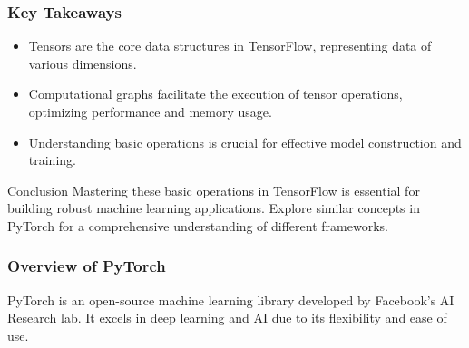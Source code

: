 \documentclass[aspectratio=169]{beamer}
\begin{document}
\begin{frame}
    \frametitle{Key Takeaways}
    \begin{itemize}
        \item Tensors are the core data structures in TensorFlow, representing data of various dimensions.
        \item Computational graphs facilitate the execution of tensor operations, optimizing performance and memory usage.
        \item Understanding basic operations is crucial for effective model construction and training.
    \end{itemize}
    \begin{block}{Conclusion}
        Mastering these basic operations in TensorFlow is essential for building robust machine learning applications. Explore similar concepts in PyTorch for a comprehensive understanding of different frameworks.
    \end{block}
\end{frame}

\begin{frame}[fragile]
    \frametitle{Overview of PyTorch}
    PyTorch is an open-source machine learning library developed by Facebook's AI Research lab. It excels in deep learning and AI due to its flexibility and ease of use.
\end{frame}
\end{document}
